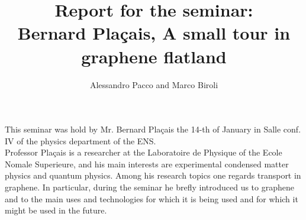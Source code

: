 \documentclass[12pt,a4paper]{article}
\author{Alessandro Pacco and Marco Biroli}
\title{Report for the seminar:\\Bernard Plaçais, A small tour in graphene flatland}
\begin{document}
 
\maketitle


This seminar was hold by Mr. Bernard Plaçais the 14-th of January in Salle conf. IV of the physics department of the ENS.\\

Professor Plaçais is a researcher at the Laboratoire de Physique of the Ecole Nomale Superieure, and his main interests are experimental condensed matter physics and quantum physics. Among his research topics one regards transport in graphene. In particular, during the seminar he brefly introduced us to graphene and to the main uses and technologies for which it is being used and for which it might be used in the future. \\
\end{document}
